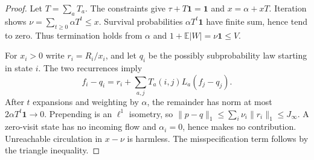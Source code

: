 \begin{proof}
Let $T=\sum_aT_a$. The constraints give $\tau+T\mathbf1=\mathbf1$
and $x=\alpha+xT$. Iteration shows
$\nu=\sum_{t\ge0}\alpha T^t\le x$. Survival probabilities
$\alpha T^t\mathbf1$ have finite sum, hence tend to zero. Thus
termination holds from $\alpha$ and
$1+\mathbb E|W|=\nu\mathbf1\le V$.

For $x_i>0$ write $r_i=R_i/x_i$, and let $q_i$ be the possibly
subprobability law starting in state $i$. The two recurrences imply
\[
 f_i-q_i=r_i+\sum_{a,j}T_a(i,j)L_a(f_j-q_j).
\]
After $t$ expansions and weighting by $\alpha$, the remainder has norm
at most $2\alpha T^t\mathbf1\to0$. Prepending is an $\ell^1$
isometry, so
$\|p-q\|_1\le\sum_i\nu_i\|r_i\|_1\le J_\infty$.
A zero-visit state has no incoming flow and $\alpha_i=0$, hence makes
no contribution. Unreachable circulation in $x-\nu$ is harmless.
The misspecification term follows by the triangle inequality.
\end{proof}
